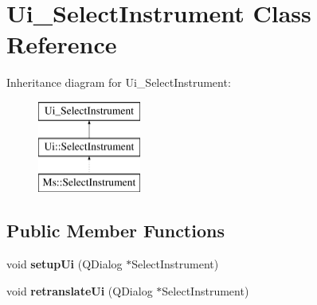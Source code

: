 \hypertarget{class_ui___select_instrument}{}\section{Ui\+\_\+\+Select\+Instrument Class Reference}
\label{class_ui___select_instrument}
Inheritance diagram for Ui\+\_\+\+Select\+Instrument\+:\begin{figure}[H]
\begin{center}
\leavevmode
\includegraphics[height=3.000000cm]{class_ui___select_instrument}
\end{center}
\end{figure}
\subsection*{Public Member Functions}
\begin{DoxyCompactItemize}
\item 
\mbox{\label{class_ui___select_instrument_abea8afaa545728e9623cf6f25461433a}} 
void {\bfseries setup\+Ui} (Q\+Dialog $\ast$Select\+Instrument)
\item 
\mbox{\label{class_ui___select_instrument_a0b8bdc030b5fe5805f2a188ac7937868}} 
void {\bfseries retranslate\+Ui} (Q\+Dialog $\ast$Select\+Instrument)
\end{DoxyCompactItemize}
